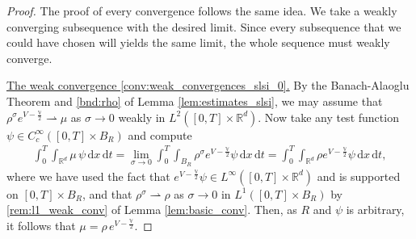 \documentclass[reqno, 11pt]{amsart}
\numberwithin{equation}{section}
\theoremstyle{definition}
\begin{document}
\begin{proof}
    The proof of every convergence follows the same idea. We take a weakly converging subsequence with the desired limit. Since every subsequence that we could have chosen will yields the same limit, the whole sequence must weakly converge.
    
    \underline{The weak convergence \ref{conv:weak_convergences_slsi_0}.}
    By the Banach-Alaoglu Theorem and \ref{bnd:rho} of Lemma \ref{lem:estimates_slsi}, we may assume that $\rho^\sigma e^{V-\frac{\mathbb{V}}{2}}\rightharpoonup \mu$ as $\sigma\rightarrow 0$ weakly in $L^2([0,T]\times \mathbb{R}^{d})$. Now take any test function $\psi\in C_c^\infty([0,T]\times B_R)$ and compute
    \begin{align*}
        \int_0^T \int_{\mathbb{R}^{d}} \mu\,\psi\,\mathrm{d} x\,\mathrm{d} t
        =\lim_{\sigma\rightarrow 0}\int_0^T \int_{B_R} \rho^\sigma e^{V-\frac{\mathbb{V}}{2}}\psi\,\mathrm{d} x\,\mathrm{d} t
        =\int_0^T \int_{\mathbb{R}^{d}} \rho e^{V-\frac{\mathbb{V}}{2}}\psi\,\mathrm{d} x\,\mathrm{d} t,
    \end{align*}
    where we have used the fact that $e^{V-\frac{\mathbb{V}}{2}}\psi\in L^\infty([0,T]\times \mathbb{R}^{d})$ and is supported on $[0,T]\times B_R$, and that $\rho^\sigma \rightharpoonup \rho$ as $\sigma\rightarrow 0$ in $L^1([0,T]\times B_R)$ by \ref{rem:l1_weak_conv} of Lemma \ref{lem:basic_conv}. Then, as $R$ and $\psi$ is arbitrary, it follows that $\mu=\rho\, e^{V-\frac{\mathbb{V}}{2}}$.
    

\end{proof}
\end{document}
